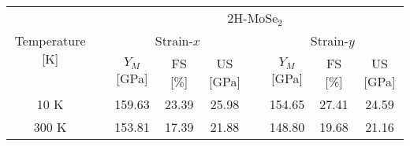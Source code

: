 \documentclass[a4paper,fleqn]{cas-sc}
\begin{document}
\begin{table*}[]
		\begin{tabular}{clccclccc}
			\hline
			\multicolumn{1}{c}{\multirow{3}{*}{Temperature [K]}} & \multicolumn{1}{l}{} &                                                                                                      \multicolumn{7}{c}{2H-MoSe$_2$}                                                                                                      \\ \cline{3-9}
			                  \multicolumn{1}{c}{}                   & \multicolumn{1}{l}{} &                                     \multicolumn{3}{c}{ Strain-$x$}                                      & \multicolumn{1}{l}{} &                                      \multicolumn{3}{c}{Strain-$y$}                                      \\ \cline{3-5}\cline{7-9}
			                  \multicolumn{1}{c}{}                   & \multicolumn{1}{l}{} & \multicolumn{1}{c}{$Y_M$ {[}GPa{]}} & \multicolumn{1}{c}{FS {[}\%{]}} & \multicolumn{1}{c}{US {[}GPa{]}} & \multicolumn{1}{l}{} & \multicolumn{1}{c}{$Y_M$ {[}GPa{]}} & \multicolumn{1}{c}{FS {[}\%{]}} & \multicolumn{1}{c}{US {[}GPa{]}} \\ \cline{1-1}\cline{3-5}\cline{7-9}
			                          10 K                            &                      &               159.63                &              23.39              &              25.98               &                      &               154.65                &              27.41              &              24.59               \\
			                \multicolumn{1}{c}{300 K}                 & \multicolumn{1}{l}{} &     \multicolumn{1}{c}{153.81}      &    \multicolumn{1}{c}{17.39}    &    \multicolumn{1}{c}{21.88}     & \multicolumn{1}{l}{} &     \multicolumn{1}{c}{148.80}      &    \multicolumn{1}{c}{19.68}    &    \multicolumn{1}{c}{21.16}
		\end{tabular}
		

\end{table*}
\end{document}
